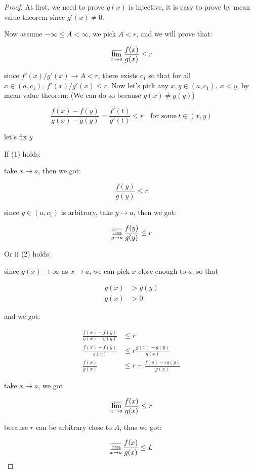 \begin{proof}
    At first, we need to prove $g(x)$ is injective, it is easy to prove by mean value theorem since $g'(x) \ne 0$.

    Now assume $-\infty \le A < \infty$, we pick $A < r$, and we will prove that:

    \[
        \varlimsup_{x \to a}\frac{f(x)}{g(x)} \le r
    \]


    since $f'(x)/g'(x) \to A < r$, there exists $c_1$ so that for all $x \in (a,c_1),\: f'(x)/g'(x) \le r$.
    Now let's pick any $x,y \in (a,c_1),\: x < y$, by mean value theorem: \: (We can do so because $g(x) \ne g(y)$)

    \[
        \frac{f(x) - f(y)}{g(x) - g(y)} = \frac{f'(t)}{g'(t)} \le r \quad \text{for some} \: t \in (x,y)
    \]

    let's fix $y$

    If (1) holds:

    take $x \to a$, then we got:

    \[
        \frac{f(y)}{g(y)} \le r
    \]


    since $y \in (a,c_1)$ is arbitrary, take $y \to a$, then we got:

    \[
        \varlimsup_{y \to a}\frac{f(y)}{g(y)} \le r
    \]

    Or if (2) holds:

    since $g(x) \to \infty$ as $x \to a$, we can pick $x$ close enough to $a$, so that

    \begin{align*}
        g(x) &> g(y) \\
        g(x) &> 0 
    \end{align*}

    and we got:

    \begin{align*}
        \frac{f(x) - f(y)}{g(x) - g(y)} & \le r \\
       \frac{f(x) - f(y)}{g(x)} & \le r \frac{g(x) -g(y)}{g(x)} \\
       \frac{f(x)}{g(x)}& \le r + \frac{f(y) - r g(y)}{g(x)}
    \end{align*}

    take $x \to a$, we got

    \[
        \varlimsup_{x \to a} \frac{f(x)}{g(x)} \le  r
    \]

    because $r$ can be arbitrary close to $A$, thus we got:

    \[
        \varlimsup_{x \to a}\frac{f(x)}{g(x)} \le L
    \]


\end{proof}
